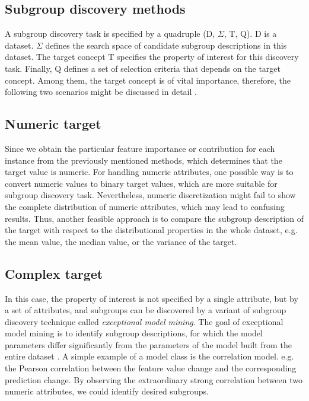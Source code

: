 \documentclass[runningheads]{llncs}
\begin{document}
	\subsection{Subgroup discovery methods}
	
	A subgroup discovery task is specified by a quadruple (D, $\Sigma$, T, Q). D is a dataset. $\Sigma$ defines the search space of candidate subgroup descriptions in this dataset. The target concept T specifies the property of interest for this discovery task. Finally, Q defines a set of selection criteria that depends on the target concept. Among them, the target concept is of vital importance, therefore, the following two scenarios might be discussed in detail \cite{lemmerich2014novel}.
	
	\subsection{Numeric target }
	
	Since we obtain the particular feature importance or contribution for each instance from the previously mentioned methods, which determines that the target value is numeric. For handling numeric attributes, one possible way is to convert numeric values to binary target values, which are more suitable for subgroup discovery task. Nevertheless, numeric discretization might fail to show the complete distribution of numeric attributes, which may lead to confusing results. Thus, another feasible approach is to compare the subgroup description of the target with respect to the distributional properties in the whole dataset, e.g. the mean value, the median value, or the variance of the target.
	
	\subsection{Complex target }
	
	In this case, the property of interest is not specified by a single attribute, but by a set of attributes, and subgroups can be discovered by a variant of subgroup discovery technique called \textit{exceptional model mining}. The goal of exceptional model mining is to identify subgroup descriptions, for which the model parameters differ significantly from the parameters of the model built from the entire dataset \cite{leman2008exceptional}. A simple example of a model class is the correlation model. e.g. the Pearson correlation between the feature value change and the corresponding prediction change. By observing the extraordinary strong correlation between two numeric attributes, we could identify desired subgroups. 
	
\end{document}
